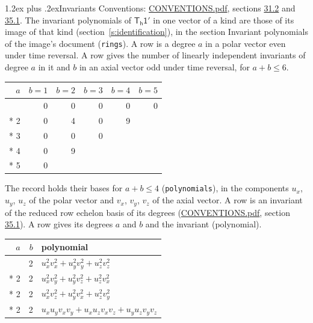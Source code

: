 \documentclass[10pt,a4paper]{article}
\makeatletter
\renewcommand\section{\@startsection{section}{1}{\z@}{-3ex plus -1ex minus -.2ex}%
  {1.2ex plus .2ex}{\normalfont\large\sffamily\bfseries\color{parttitle}}}
\numberwithin{equation}{section}
\newcommand{\grp}[1]{\mathsf{#1}}
\makeatother
\begin{document}
\section{Invariants}\label{s:invariants}
Conventions: \href{../../CONVENTIONS.pdf}{CONVENTIONS.pdf}, sections \href{../../CONVENTIONS.pdf\#conv.31.2}{31.2} and \href{../../CONVENTIONS.pdf\#conv.35.1}{35.1}.
The invariant polynomials of $\grp{T_{h}1'}$ in one vector of a kind are those of its image of that kind (section~\ref{s:identification}), in the section Invariant polynomials of the image's document (\texttt{rings}).
\leavevmode\label{n:index.degree.polar}\label{n:index.degree.axial}A row is a degree $a$ in a polar vector even under time reversal. A row gives the number of linearly independent invariants of degree $a$ in it and $b$ in an axial vector odd under time reversal, for $a + b \le 6$.
{\small\begin{longtable}{@{}rrrrrr@{}}\toprule
$a$ & $b = 1$ & $b = 2$ & $b = 3$ & $b = 4$ & $b = 5$\\\midrule\endhead
\bottomrule\endfoot\endlastfoot
1 & 0 & 0 & 0 & 0 & 0\\*
2 & 0 & 4 & 0 & 9 & \\*
3 & 0 & 0 & 0 &  & \\*
4 & 0 & 9 &  &  & \\*
5 & 0 &  &  &  & \\
\bottomrule\end{longtable}}
\leavevmode\label{n:local.component.polar}\label{n:local.component.axial}The record holds their bases for $a + b \le 4$ (\texttt{polynomials}), in the components $u_{x}$, $u_{y}$, $u_{z}$ of the polar vector and $v_{x}$, $v_{y}$, $v_{z}$ of the axial vector. \label{n:head.polynomial}A row is an invariant of the reduced row echelon basis of its degrees (\href{../../CONVENTIONS.pdf}{CONVENTIONS.pdf}, section \href{../../CONVENTIONS.pdf\#conv.35.1}{35.1}). A row gives its degrees $a$ and $b$ and the invariant (polynomial).
{\small\renewcommand{\arraystretch}{1.2}\begin{longtable}{@{}rrl@{}}\toprule
$a$ & $b$ & polynomial\\\midrule\endhead
\bottomrule\endfoot\endlastfoot
2 & 2 & $u_{x}^{2}v_{x}^{2} + u_{y}^{2}v_{y}^{2} + u_{z}^{2}v_{z}^{2}$\\*
2 & 2 & $u_{x}^{2}v_{y}^{2} + u_{y}^{2}v_{z}^{2} + u_{z}^{2}v_{x}^{2}$\\*
2 & 2 & $u_{x}^{2}v_{z}^{2} + u_{y}^{2}v_{x}^{2} + u_{z}^{2}v_{y}^{2}$\\*
2 & 2 & $u_{x}u_{y}v_{x}v_{y} + u_{x}u_{z}v_{x}v_{z} + u_{y}u_{z}v_{y}v_{z}$\\
\bottomrule\end{longtable}}
\end{document}
